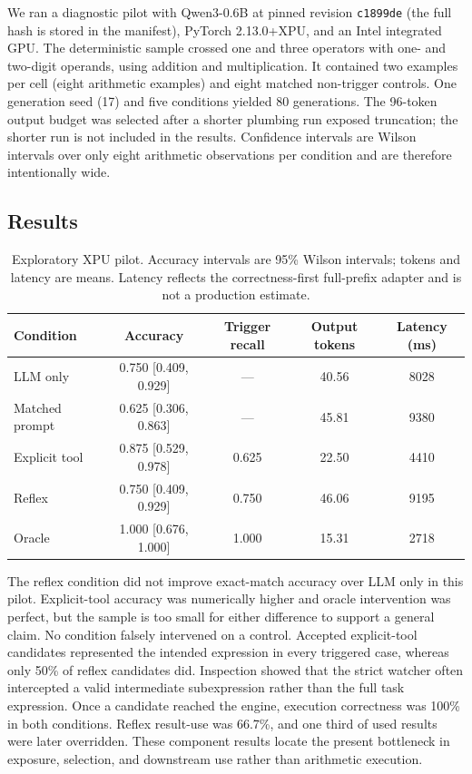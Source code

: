 \documentclass[11pt]{article}
\begin{document}
We ran a diagnostic pilot with Qwen3-0.6B at pinned revision
\texttt{c1899de} (the full hash is stored in the manifest), PyTorch
2.13.0+XPU, and an Intel integrated GPU. The deterministic sample crossed one
and three operators with one- and two-digit operands, using addition and
multiplication. It contained two examples per cell (eight arithmetic examples)
and eight matched non-trigger controls. One generation seed (17) and five
conditions yielded 80 generations. The 96-token output budget was selected
after a shorter plumbing run exposed truncation; the shorter run is not included
in the results. Confidence intervals are Wilson intervals over only eight
arithmetic observations per condition and are therefore intentionally wide.

\subsection{Results}

\begin{table}[t]
\centering
\small
\caption{Exploratory XPU pilot. Accuracy intervals are 95\% Wilson intervals;
tokens and latency are means. Latency reflects the correctness-first
full-prefix adapter and is not a production estimate.}
\label{tab:xpu-pilot}
\begin{tabular}{@{}lcccc@{}}
\toprule
Condition & Accuracy & Trigger recall & Output tokens & Latency (ms) \\
\midrule
LLM only      & 0.750 [0.409, 0.929] & ---   & 40.56 & 8028 \\
Matched prompt& 0.625 [0.306, 0.863] & ---   & 45.81 & 9380 \\
Explicit tool & 0.875 [0.529, 0.978] & 0.625 & 22.50 & 4410 \\
Reflex        & 0.750 [0.409, 0.929] & 0.750 & 46.06 & 9195 \\
Oracle        & 1.000 [0.676, 1.000] & 1.000 & 15.31 & 2718 \\
\bottomrule
\end{tabular}
\end{table}

The reflex condition did not improve exact-match accuracy over LLM only in this
pilot. Explicit-tool accuracy was numerically higher and oracle intervention was
perfect, but the sample is too small for either difference to support a general
claim. No condition falsely intervened on a control. Accepted explicit-tool
candidates represented the intended expression in every triggered case, whereas
only 50\% of reflex candidates did. Inspection showed that the strict watcher
often intercepted a valid intermediate subexpression rather than the full task
expression. Once a candidate reached the engine, execution correctness was
100\% in both conditions. Reflex result-use was 66.7\%, and one third of used
results were later overridden. These component results locate the present
bottleneck in exposure, selection, and downstream use rather than arithmetic
execution.
\end{document}

